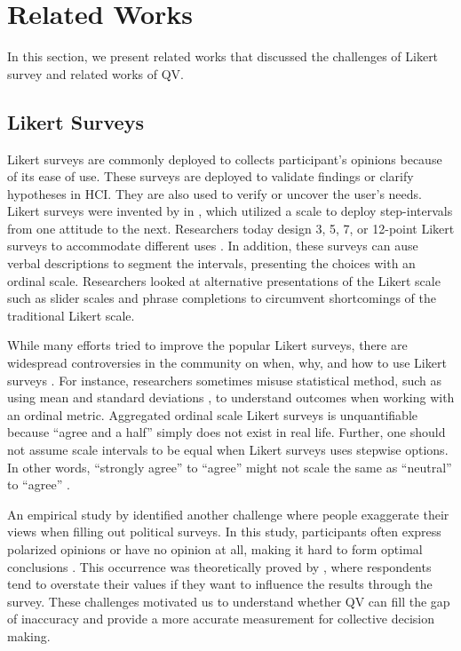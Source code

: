 \section{Related Works} \label{related_works}
In this section, 
we present related works
that discussed the challenges
of Likert survey
and related works of QV.

\subsection{Likert Surveys}
Likert surveys are commonly deployed
to collects participant's opinions
because of its ease of use.
These surveys are deployed
to validate findings or clarify hypotheses
\cite{ozok2009survey, ledo2018evaluation} in HCI.
They are also used to verify or uncover the user's needs.
Likert surveys were invented by \textcite{likert1932technique} 
in \citeyear{likert1932technique},
which utilized a scale to deploy step-intervals 
from one attitude to the next.
Researchers today design 3, 5, 7, 
or 12-point Likert surveys to accommodate different uses
\cite{garland2008computer,finstad2010}.
In addition, these surveys
can ause verbal descriptions
to segment the intervals,
presenting the choices with an ordinal scale.
Researchers looked at
alternative presentations of the Likert scale
such as slider scales \cite{roster2015exploring} 
and phrase completions \cite{hodge2003phrase}
to circumvent shortcomings of the traditional Likert scale.

While many efforts tried to
improve the popular Likert surveys,
there are widespread controversies in the community on
when, why, and how to use Likert surveys \cite{bishop2015use}.
For instance, 
researchers sometimes misuse statistical method,
such as using mean and standard deviations \cite{jamieson2004likert},
to understand outcomes
when working with an ordinal metric.
Aggregated ordinal scale Likert surveys is 
unquantifiable because ``agree and a half'' 
simply does not exist in real life.
Further, 
one should not assume scale intervals to be equal
when Likert surveys uses stepwise options.
In other words,
``strongly agree'' to ``agree''
might not scale the same as 
``neutral'' to ``agree'' 
\cite{jamieson2004likert, edmondson2005likert}.

An empirical study by \textcite{quarfoot2017quadratic}
identified another challenge
where people exaggerate their views
when filling out political surveys.
In this study,
participants often express polarized opinions
or have no opinion at all,
making it hard to form optimal conclusions \cite{posner2018radical}.
This occurrence was 
theoretically proved by \textcite{cavaille2018towards},
where respondents tend to overstate their values
if they want to influence the results through the survey.
These challenges motivated us 
to understand whether QV can fill the gap of inaccuracy
and provide a more accurate measurement
for collective decision making.\par

